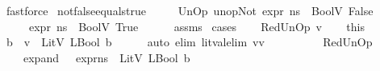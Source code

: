 \begin{isabellebody}
\ fastforce\isanewline
{}\isamarkupfalse%
%
\endisatagproof
{\isafoldproof}%
%
\isadelimproof
\isanewline
%
\endisadelimproof
\isanewline
{}\isamarkupfalse%
\ not{\isacharunderscore}{\kern0pt}false{\isacharunderscore}{\kern0pt}equals{\isacharunderscore}{\kern0pt}true{\isacharcolon}{\kern0pt}\isanewline
\ \ \ {\isachardoublequoteopen}{\isasymLambda}{\isacharcomma}{\kern0pt}{\isasymGamma}{\isacharcomma}{\kern0pt}{\isasymOmega}\ {\isasymturnstile}\ {\isasymlangle}UnOp\ unop{\isachardot}{\kern0pt}Not\ expr{\isacharcomma}{\kern0pt}\ ns{}{\isasymrangle}\ {\isasymDown}\ BoolV\ False{\isachardoublequoteclose}\isanewline
\ \ \ {\isachardoublequoteopen}{\isasymLambda}{\isacharcomma}{\kern0pt}{\isasymGamma}{\isacharcomma}{\kern0pt}{\isasymOmega}\ {\isasymturnstile}\ {\isasymlangle}expr{\isacharcomma}{\kern0pt}\ ns{}{\isasymrangle}\ {\isasymDown}\ BoolV\ {\isacharparenleft}{\kern0pt}True{\isacharparenright}{\kern0pt}{\isachardoublequoteclose}\ \ \isanewline
%
\isadelimproof
\ \ %
\endisadelimproof
%
\isatagproof
{}\isamarkupfalse%
\ assms\isanewline
{}\isamarkupfalse%
\ cases\isanewline
\ \ \isamarkupfalse%
\ {\isacharparenleft}{\kern0pt}RedUnOp\ v{\isacharparenright}{\kern0pt}\isanewline
\ \ \isamarkupfalse%
\ this\ \isamarkupfalse%
\ b{}\ \ {\isachardoublequoteopen}v\ {\isacharequal}{\kern0pt}\ LitV\ {\isacharparenleft}{\kern0pt}LBool\ b{}{\isacharparenright}{\kern0pt}{\isachardoublequoteclose}\isanewline
\ \ \ \ \isamarkupfalse%
\ {\isacharparenleft}{\kern0pt}auto\ elim{\isacharcolon}{\kern0pt}\ lit{\isacharunderscore}{\kern0pt}val{\isacharunderscore}{\kern0pt}elim{\isacharbrackleft}{\kern0pt}\ v{\isacharequal}{\kern0pt}v{\isacharbrackright}{\kern0pt}{\isacharparenright}{\kern0pt}\ \ \ \ \ \ \isanewline
\ \ \isamarkupfalse%
\ RedUnOp\ \isamarkupfalse%
\ \isanewline
\ \ \ \ expand{}{\isacharcolon}{\kern0pt}\ {\isachardoublequoteopen}{\isasymLambda}{\isacharcomma}{\kern0pt}{\isasymGamma}{\isacharcomma}{\kern0pt}{\isasymOmega}\ {\isasymturnstile}\ {\isasymlangle}expr{\isacharcomma}{\kern0pt}ns{}{\isasymrangle}\ {\isasymDown}\ {\isacharparenleft}{\kern0pt}LitV\ {\isacharparenleft}{\kern0pt}LBool\ b{}{\isacharparenright}{\kern0pt}{\isacharparenright}{\kern0pt}{\isachardoublequoteclose}\ \ \isanewline

\end{isabellebody}
